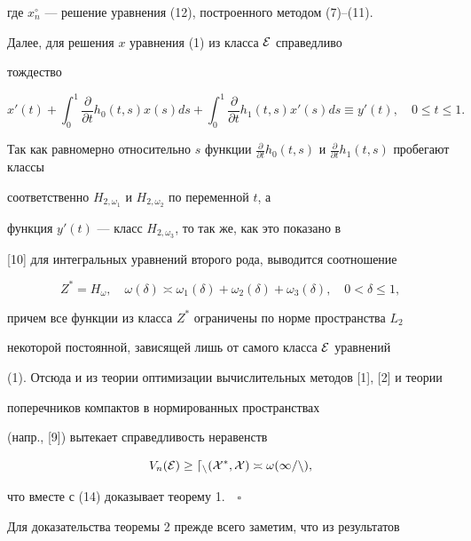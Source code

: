 где $x^\circ_n$ --- решение уравнения (12), построенного методом (7)--(11). 


 


Далее, для решения $x$ уравнения (1) из класса $\cal E$ справедливо 


тождество 


$$ 


x'(t)+\int^1_0\frac{\partial}{\partial t}h_0(t,s)x(s)ds+ 


\int^1_0\frac{\partial}{\partial t}h_1(t,s)x'(s)ds\equiv 


y'(t),\quad 0\le t\le1. 


$$ 


Так как равномерно относительно $s$ функции $\frac{\partial}{\partial t} 


h_0(t,s)$ и $\frac{\partial}{\partial t}h_1(t,s)$ пробегают классы 


соответственно $H_{2,\omega_1}$ и $H_{2,\omega_2}$ по переменной $t$, а 


функция $y'(t)$ --- класс $H_{2,\omega_3}$, то так же, как это показано в 


[10] для интегральных уравнений второго рода, выводится соотношение 


$$ 


Z^*=H_\omega,\quad \omega(\delta)\asymp\omega_1(\delta)+ 


\omega_2(\delta)+\omega_3(\delta),\quad 0<\delta\le1, 


$$ 


причем все функции из класса $Z^*$ ограничены по норме пространства $L_2$ 


некоторой постоянной, зависящей лишь от самого класса $\cal E$ уравнений 


(1). Отсюда и из теории оптимизации вычислительных методов [1], [2] и теории 


поперечников компактов в нормированных пространствах 


(напр., [9]) вытекает справедливость неравенств 


$$ 


V_n(\cal E)\ge d_n(X^*,X)\asymp\omega(1/n), 


$$ 


что вместе с (14) доказывает теорему 1.$\quad\square$ 


\medskip 


 


Для доказательства теоремы 2 прежде всего заметим, что из результатов 


